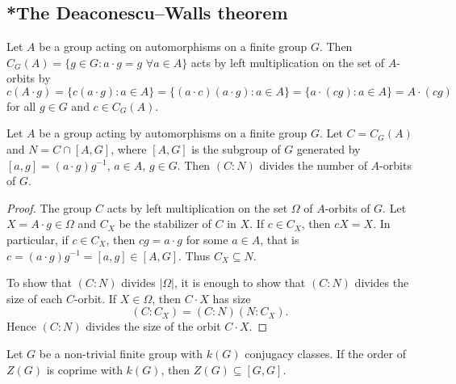 \section{}

\subsection{*The Deaconescu--Walls theorem}

Let $A$ be a group acting on automorphisms on a finite group $G$. Then 
$C_{G}(A)=\{g\in G:a\cdot g=g\,\,\forall a\in A\}$ acts by left multiplication 
on the set of 
$A$-orbits by 
\[
  c(A\cdot g)
  =\{c(a\cdot g):a\in A\}
  =\{(a\cdot c)(a\cdot g):a\in A\}
  =\{a\cdot (cg):a\in A\}
  =A\cdot (cg)
\]
for all $g\in G$ and $c\in C_G(A)$.


\begin{theorem}
	\label{thm:DeaconescuWalls}
	Let $A$ be a group acting by automorphisms on a finite group $G$. Let
	$C=C_{G}(A)$ and $N=C\cap [A,G]$,
	where $[A,G]$ is the subgroup of $G$ generated by $[a,g]=(a\cdot g)g^{-1}$,
	$a\in A$, $g\in G$.  Then $(C:N)$ divides the number of $A$-orbits of 
	$G$. 
\end{theorem}

\begin{proof}
  The group $C$ acts by left multiplication on the set $\Omega$ of 
  $A$-orbits of $G$. Let $X=A\cdot g\in\Omega$ and $C_X$ be the stabilizer of 
  $C$ in $X$. If $c\in C_X$, then $cX=X$. In particular, if $c\in C_X$, then 
  $cg=a\cdot g$ for some $a\in A$, that is $c=(a\cdot
  g)g^{-1}=[a,g]\in [A,G]$. Thus $C_X\subseteq N$.

  To show that $(C:N)$ divides $|\Omega|$, it is enough to show that 
  $(C:N)$ divides the size of each $C$-orbit. If $X\in\Omega$, then $C\cdot
  X$ has size 
  \[
	(C:C_X)=(C:N)(N:C_X).
  \]
  Hence $(C:N)$ divides the size of the orbit $C\cdot X$.
\end{proof}

\begin{corollary}
	\label{cor:Z(G)subset[G,G]}
  Let $G$ be a non-trivial finite group with $k(G)$ conjugacy classes. 
  If the order of $Z(G)$ is coprime with $k(G)$, then  
  $Z(G)\subseteq[G,G]$.
\end{corollary}


